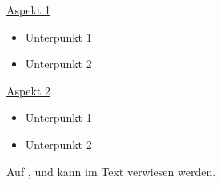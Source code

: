 
\underline{Aspekt 1}
\begin{itemize}
  \item Unterpunkt 1
  \item Unterpunkt 2
\end{itemize}\vspace{10pt}

\underline{Aspekt 2}
\begin{itemize}
  \item Unterpunkt 1
  \item Unterpunkt 2
\end{itemize}\vspace{10pt}


Auf ,  und  kann im Text verwiesen werden.


\newpage